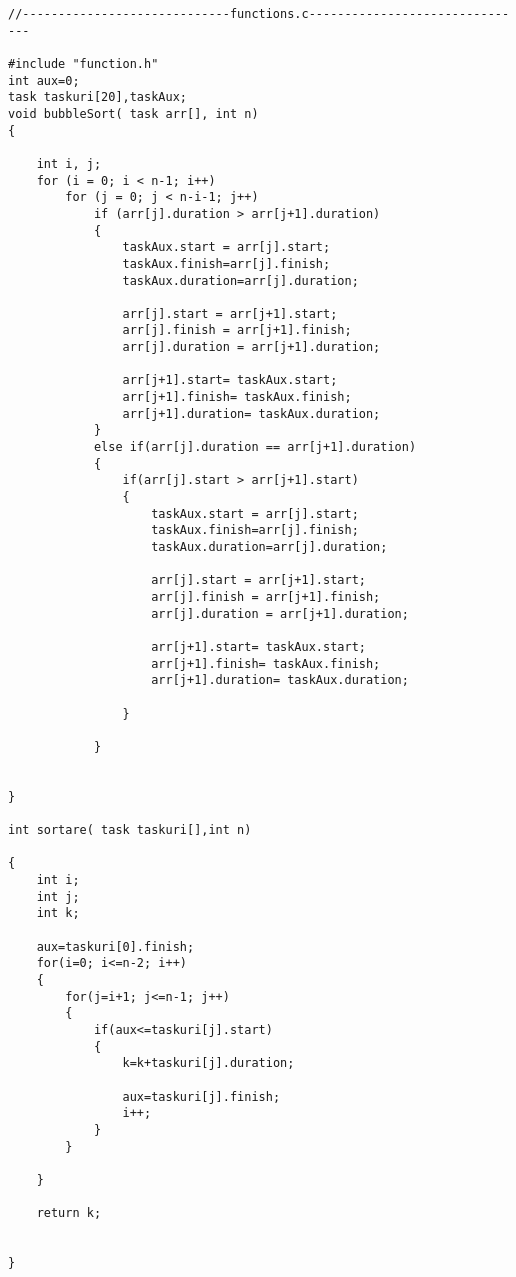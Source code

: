 \documentclass[14pt]{article}
\begin{document}
\begin{lstlisting}
//-----------------------------functions.c-------------------------------

#include "function.h"
int aux=0;
task taskuri[20],taskAux;
void bubbleSort( task arr[], int n)
{

    int i, j;                                     
    for (i = 0; i < n-1; i++)
        for (j = 0; j < n-i-1; j++)
            if (arr[j].duration > arr[j+1].duration)
            {
                taskAux.start = arr[j].start;            
                taskAux.finish=arr[j].finish;
                taskAux.duration=arr[j].duration;

                arr[j].start = arr[j+1].start;             
                arr[j].finish = arr[j+1].finish;
                arr[j].duration = arr[j+1].duration;

                arr[j+1].start= taskAux.start;             
                arr[j+1].finish= taskAux.finish;
                arr[j+1].duration= taskAux.duration;
            }
            else if(arr[j].duration == arr[j+1].duration)
            {
                if(arr[j].start > arr[j+1].start)
                {
                    taskAux.start = arr[j].start;             
                    taskAux.finish=arr[j].finish;
                    taskAux.duration=arr[j].duration;

                    arr[j].start = arr[j+1].start;              
                    arr[j].finish = arr[j+1].finish;
                    arr[j].duration = arr[j+1].duration;

                    arr[j+1].start= taskAux.start;             
                    arr[j+1].finish= taskAux.finish;
                    arr[j+1].duration= taskAux.duration;

                }

            }


}

int sortare( task taskuri[],int n)

{
    int i;
    int j;
    int k;
    
    aux=taskuri[0].finish;
    for(i=0; i<=n-2; i++)               
    {
        for(j=i+1; j<=n-1; j++)
        {
            if(aux<=taskuri[j].start)
            {
                k=k+taskuri[j].duration;

                aux=taskuri[j].finish;
                i++;
            }
        }

    }

    return k;


}



\end{lstlisting}
\end{document}
